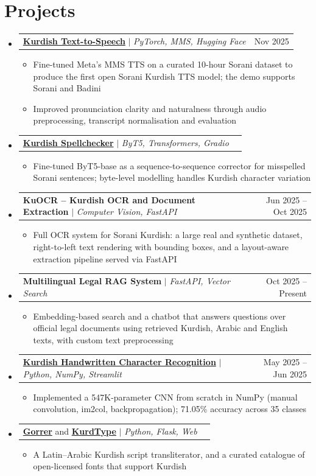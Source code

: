 \documentclass[letterpaper,11pt]{article}
\makeatletter
\newcommand{\resumeItem}[1]{
  \item\small{
    {#1 \vspace{-2pt}}
  }
}
\newcommand{\resumeProjectHeading}[2]{
    \item
    \begin{tabular*}{0.97\textwidth}{l@{\extracolsep{\fill}}r}
      \small#1 & #2 \\
    \end{tabular*}\vspace{-7pt}
}
\newcommand{\resumeSubHeadingListStart}{\begin{itemize}[leftmargin=0.15in, label={}]}
\newcommand{\resumeSubHeadingListEnd}{\end{itemize}}
\newcommand{\resumeItemListStart}{\begin{itemize}}
\newcommand{\resumeItemListEnd}{\end{itemize}\vspace{-5pt}}
\makeatother
\begin{document}
\section{Projects}
    \resumeSubHeadingListStart
      \resumeProjectHeading
          {\textbf{\href{https://huggingface.co/spaces/akam-ot/kurdish-tts}{Kurdish Text-to-Speech}} $|$ \emph{PyTorch, MMS, Hugging Face}}{Nov 2025}
          \resumeItemListStart
            \resumeItem{Fine-tuned Meta's MMS TTS on a curated 10-hour Sorani dataset to produce the first open Sorani Kurdish TTS model; the demo supports Sorani and Badini}
            \resumeItem{Improved pronunciation clarity and naturalness through audio preprocessing, transcript normalisation and evaluation}
          \resumeItemListEnd
      \resumeProjectHeading
          {\textbf{\href{https://huggingface.co/spaces/akam-ot/kurdish-spellchecker}{Kurdish Spellchecker}} $|$ \emph{ByT5, Transformers, Gradio}}{}
          \resumeItemListStart
            \resumeItem{Fine-tuned ByT5-base as a sequence-to-sequence corrector for misspelled Sorani sentences; byte-level modelling handles Kurdish character variation}
          \resumeItemListEnd
      \resumeProjectHeading
          {\textbf{KuOCR -- Kurdish OCR and Document Extraction} $|$ \emph{Computer Vision, FastAPI}}{Jun 2025 -- Oct 2025}
          \resumeItemListStart
            \resumeItem{Full OCR system for Sorani Kurdish: a large real and synthetic dataset, right-to-left text rendering with bounding boxes, and a layout-aware extraction pipeline served via FastAPI}
          \resumeItemListEnd
      \resumeProjectHeading
          {\textbf{Multilingual Legal RAG System} $|$ \emph{FastAPI, Vector Search}}{Oct 2025 -- Present}
          \resumeItemListStart
            \resumeItem{Embedding-based search and a chatbot that answers questions over official legal documents using retrieved Kurdish, Arabic and English texts, with custom text preprocessing}
          \resumeItemListEnd
      \resumeProjectHeading
          {\textbf{\href{https://github.com/akam-ot/kurdish-character-cnn-scratch}{Kurdish Handwritten Character Recognition}} $|$ \emph{Python, NumPy, Streamlit}}{May 2025 -- Jun 2025}
          \resumeItemListStart
            \resumeItem{Implemented a 547K-parameter CNN from scratch in NumPy (manual convolution, im2col, backpropagation); 71.05\% accuracy across 35 classes}
          \resumeItemListEnd
      \resumeProjectHeading
          {\textbf{\href{https://gorrer.vercel.app/}{Gorrer}} and \textbf{\href{https://kurdtype.vercel.app/}{KurdType}} $|$ \emph{Python, Flask, Web}}{}
          \resumeItemListStart
            \resumeItem{A Latin--Arabic Kurdish script transliterator, and a curated catalogue of open-licensed fonts that support Kurdish}
          \resumeItemListEnd
    \resumeSubHeadingListEnd
\end{document}
